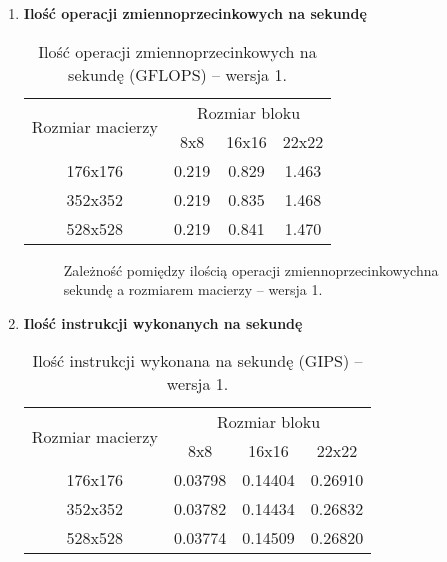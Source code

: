 \begin{enumerate}
\item \textbf{Ilość operacji zmiennoprzecinkowych na sekundę} \newline

\begin{table}[H]
\centering
\begin{tabular}{|c|c|c|c|}
\hline
\multirow{2}{*}{Rozmiar macierzy} & \multicolumn{3}{c|}{Rozmiar bloku} \\ \cline{2-4}
& 8x8 & 16x16 & 22x22 \\ \hline
176x176 & 0.219 & 0.829 & 1.463 \\ \hline
352x352 & 0.219 & 0.835 & 1.468 \\ \hline
528x528 & 0.219 & 0.841 & 1.470 \\ \hline
\end{tabular}
\caption{Ilość operacji zmiennoprzecinkowych na sekundę (GFLOPS) -- wersja 1.}
\end{table}

\begin{figure}[H]
\centering
\caption{Zależność pomiędzy ilością operacji zmiennoprzecinkowychna sekundę a rozmiarem macierzy -- wersja 1.}
\end{figure}


\item \textbf{Ilość instrukcji wykonanych na sekundę} \newline

\begin{table}[H]
\centering
\begin{tabular}{|c|c|c|c|}
\hline
\multirow{2}{*}{Rozmiar macierzy} & \multicolumn{3}{c|}{Rozmiar bloku} \\ \cline{2-4}
& 8x8 & 16x16 & 22x22 \\ \hline
176x176 & 0.03798 & 0.14404 & 0.26910 \\ \hline
352x352 & 0.03782 & 0.14434 & 0.26832 \\ \hline
528x528 & 0.03774 & 0.14509 & 0.26820 \\ \hline
\end{tabular}
\caption{Ilość instrukcji wykonana na sekundę (GIPS) -- wersja 1.}
\end{table}


\end{enumerate}
